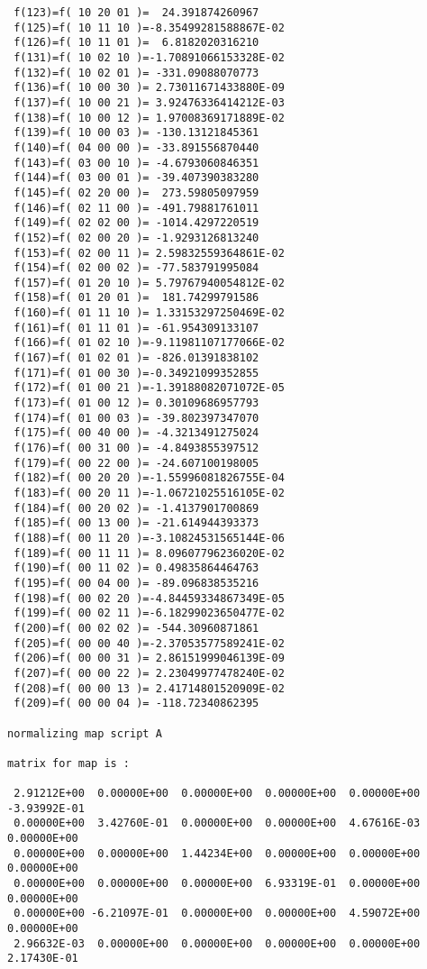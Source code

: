 \begin{footnotesize}
\begin{verbatim}
 f(123)=f( 10 20 01 )=  24.391874260967
 f(125)=f( 10 11 10 )=-8.35499281588867E-02
 f(126)=f( 10 11 01 )=  6.8182020316210
 f(131)=f( 10 02 10 )=-1.70891066153328E-02
 f(132)=f( 10 02 01 )= -331.09088070773
 f(136)=f( 10 00 30 )= 2.73011671433880E-09
 f(137)=f( 10 00 21 )= 3.92476336414212E-03
 f(138)=f( 10 00 12 )= 1.97008369171889E-02
 f(139)=f( 10 00 03 )= -130.13121845361
 f(140)=f( 04 00 00 )= -33.891556870440
 f(143)=f( 03 00 10 )= -4.6793060846351
 f(144)=f( 03 00 01 )= -39.407390383280
 f(145)=f( 02 20 00 )=  273.59805097959
 f(146)=f( 02 11 00 )= -491.79881761011
 f(149)=f( 02 02 00 )= -1014.4297220519
 f(152)=f( 02 00 20 )= -1.9293126813240
 f(153)=f( 02 00 11 )= 2.59832559364861E-02
 f(154)=f( 02 00 02 )= -77.583791995084
 f(157)=f( 01 20 10 )= 5.79767940054812E-02
 f(158)=f( 01 20 01 )=  181.74299791586
 f(160)=f( 01 11 10 )= 1.33153297250469E-02
 f(161)=f( 01 11 01 )= -61.954309133107
 f(166)=f( 01 02 10 )=-9.11981107177066E-02
 f(167)=f( 01 02 01 )= -826.01391838102
 f(171)=f( 01 00 30 )=-0.34921099352855
 f(172)=f( 01 00 21 )=-1.39188082071072E-05
 f(173)=f( 01 00 12 )= 0.30109686957793
 f(174)=f( 01 00 03 )= -39.802397347070
 f(175)=f( 00 40 00 )= -4.3213491275024
 f(176)=f( 00 31 00 )= -4.8493855397512
 f(179)=f( 00 22 00 )= -24.607100198005
 f(182)=f( 00 20 20 )=-1.55996081826755E-04
 f(183)=f( 00 20 11 )=-1.06721025516105E-02
 f(184)=f( 00 20 02 )= -1.4137901700869
 f(185)=f( 00 13 00 )= -21.614944393373
 f(188)=f( 00 11 20 )=-3.10824531565144E-06
 f(189)=f( 00 11 11 )= 8.09607796236020E-02
 f(190)=f( 00 11 02 )= 0.49835864464763
 f(195)=f( 00 04 00 )= -89.096838535216
 f(198)=f( 00 02 20 )=-4.84459334867349E-05
 f(199)=f( 00 02 11 )=-6.18299023650477E-02
 f(200)=f( 00 02 02 )= -544.30960871861
 f(205)=f( 00 00 40 )=-2.37053577589241E-02
 f(206)=f( 00 00 31 )= 2.86151999046139E-09
 f(207)=f( 00 00 22 )= 2.23049977478240E-02
 f(208)=f( 00 00 13 )= 2.41714801520909E-02
 f(209)=f( 00 00 04 )= -118.72340862395

normalizing map script A

matrix for map is :

 2.91212E+00  0.00000E+00  0.00000E+00  0.00000E+00  0.00000E+00 -3.93992E-01
 0.00000E+00  3.42760E-01  0.00000E+00  0.00000E+00  4.67616E-03  0.00000E+00
 0.00000E+00  0.00000E+00  1.44234E+00  0.00000E+00  0.00000E+00  0.00000E+00
 0.00000E+00  0.00000E+00  0.00000E+00  6.93319E-01  0.00000E+00  0.00000E+00
 0.00000E+00 -6.21097E-01  0.00000E+00  0.00000E+00  4.59072E+00  0.00000E+00
 2.96632E-03  0.00000E+00  0.00000E+00  0.00000E+00  0.00000E+00  2.17430E-01


\end{verbatim}
\end{footnotesize}
